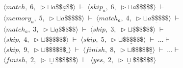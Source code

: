 \documentclass[14pt]{extarticle}
\begin{document}
\begin{align*}
    \langle match,\; 6,\; \triangleright\sqcup a\$\$\underline{a}\$\$ \rangle \;\vdash\; \langle skip_a,\; 6,\; \triangleright\sqcup a\$\$\underline{\$}\$\$ \rangle \;\vdash \\
    \langle memory_a,\; 5,\; \triangleright\sqcup a\$\underline{\$}\$\$\$ \rangle \;\vdash\; \langle match_a,\; 4,\; \triangleright\sqcup a\$\underline{\$}\$\$\$ \rangle \;\vdash \\
    \langle match_a,\; 3,\; \triangleright\sqcup \underline{a}\$\$\$\$\$ \rangle \;\vdash\; \langle skip,\; 3,\; \triangleright\sqcup \underline{\$}\$\$\$\$\$ \rangle \;\vdash \\
    \langle skip,\; 4,\; \triangleright\sqcup \$\underline{\$}\$\$\$\$ \rangle \;\vdash\; \langle skip,\; 5,\; \triangleright\sqcup \$\$\underline{\$}\$\$\$ \rangle \;\vdash\; \dots \vdash \\
    \langle skip,\; 9,\; \triangleright\sqcup \$\$\$\$\$\$\_ \rangle \;\vdash\; \langle finish,\; 8,\; \triangleright\sqcup \$\$\$\$\$\underline{\$} \rangle \;\vdash\; \dots \vdash \\
    \langle finish,\; 2,\; \triangleright\underline\sqcup \$\$\$\$\$\$ \rangle \;\vdash\; \langle yes,\; 2,\; \triangleright\underline\sqcup \$\$\$\$\$\$ \rangle
\end{align*}
\end{document}
